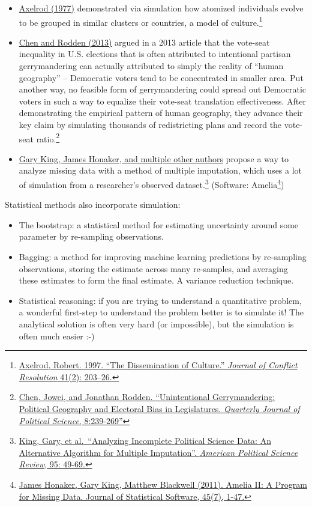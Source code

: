 \documentclass[
]{book}
\providecommand{\tightlist}{%
  \setlength{\itemsep}{0pt}\setlength{\parskip}{0pt}}
\theoremstyle{definition}
\theoremstyle{definition}
\theoremstyle{definition}
\theoremstyle{definition}
\theoremstyle{remark}
\begin{document}
\begin{itemize}
\tightlist
\item
  \href{http://www-personal.umich.edu/~axe/research/Dissemination.pdf}{Axelrod (1977)} demonstrated via simulation how atomized individuals evolve to be grouped in similar clusters or countries, a model of culture.\footnote{\href{http://www-personal.umich.edu/~axe/research/Dissemination.pdf}{Axelrod, Robert. 1997. ``The Dissemination of Culture.'' \emph{Journal of Conflict Resolution} 41(2): 203--26.}}
\item
  \href{http://www-personal.umich.edu/~jowei/florida.pdf}{Chen and Rodden (2013)} argued in a 2013 article that the vote-seat inequality in U.S. elections that is often attributed to intentional partisan gerrymandering can actually attributed to simply the reality of ``human geography'' -- Democratic voters tend to be concentrated in smaller area. Put another way, no feasible form of gerrymandering could spread out Democratic voters in such a way to equalize their vote-seat translation effectiveness. After demonstrating the empirical pattern of human geography, they advance their key claim by simulating thousands of redistricting plans and record the vote-seat ratio.\footnote{\href{http://www-personal.umich.edu/~jowei/florida.pdf}{Chen, Jowei, and Jonathan Rodden. ``Unintentional Gerrymandering: Political Geography and Electoral Bias in Legislatures. \emph{Quarterly Journal of Political Science}, 8:239-269''}}
\item
  \href{https://gking.harvard.edu/files/abs/evil-abs.shtml}{Gary King, James Honaker, and multiple other authors} propose a way to analyze missing data with a method of multiple imputation, which uses a lot of simulation from a researcher's observed dataset.\footnote{\href{https://gking.harvard.edu/files/abs/evil-abs.shtml}{King, Gary, et al.~``Analyzing Incomplete Political Science Data: An Alternative Algorithm for Multiple Imputation''. \emph{American Political Science Review}, 95: 49-69.}} (Software: Amelia\footnote{\href{http://www.jstatsoft.org/v45/i07/}{James Honaker, Gary King, Matthew Blackwell (2011). Amelia II: A Program for Missing Data. Journal of
    Statistical Software, 45(7), 1-47.}})
\end{itemize}

Statistical methods also incorporate simulation:

\begin{itemize}
\tightlist
\item
  The bootstrap: a statistical method for estimating uncertainty around some parameter by re-sampling observations.
\item
  Bagging: a method for improving machine learning predictions by re-sampling observations, storing the estimate across many re-samples, and averaging these estimates to form the final estimate. A variance reduction technique.
\item
  Statistical reasoning: if you are trying to understand a quantitative problem, a wonderful first-step to understand the problem better is to simulate it! The analytical solution is often very hard (or impossible), but the simulation is often much easier :-)
\end{itemize}
\end{document}
